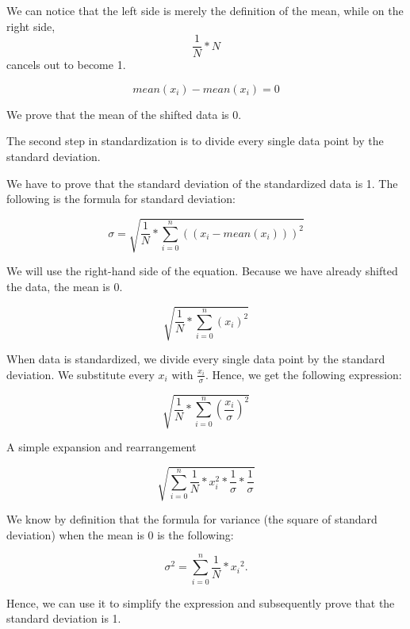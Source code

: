 \documentclass{article}
\begin{document}
We can notice that the left side is merely the definition of the mean,
while on the right side, \[\frac{1}{N}*N\] cancels out to become 1.

\begin{equation}  
mean({x_{i}}) - mean({x_{i}}) = 0
\end{equation}

We prove that the mean of the shifted data is 0.\newline

The second step in standardization is to divide every single data point by the standard deviation. \newline

We have to prove that the standard deviation of the standardized data is 1. The following is the formula for standard deviation:

\begin{equation}  
\sigma = \sqrt{\frac{1}{N}*\sum_{i=0}^{n}((x_{i}-mean(x_{i})))^2}
\end{equation}

We will use the right-hand side of the equation. Because we have already shifted the data, the mean is 0.

\begin{equation}  
\sqrt{\frac{1}{N}*\sum_{i=0}^{n}(x_{i})^2}
\end{equation}

When data is standardized, we divide every single data point by the standard deviation. We substitute every $x_{i}$ with  $\frac{x_{i}}{\sigma}$. Hence, we get the following expression:

\begin{equation}  
\sqrt{\frac{1}{N}*\sum_{i=0}^{n}(\frac{x_{i}}{\sigma})^2}
\end{equation}

A simple expansion and rearrangement 

\begin{equation}  
\sqrt{\sum_{i=0}^{n}\frac{1}{N}*x_{i}^2*\frac{1}{\sigma}*\frac{1}{\sigma}}
\end{equation}

We know by definition that the formula for variance (the square of standard deviation) when the mean is 0 is the following:

\begin{equation}  
\sigma^2 = \sum_{i=0}^{n}\frac{1}{N}*{x_{i}}^2.
\end{equation}

Hence, we can use it to simplify the expression and subsequently prove that the standard deviation is 1.
\end{document}

